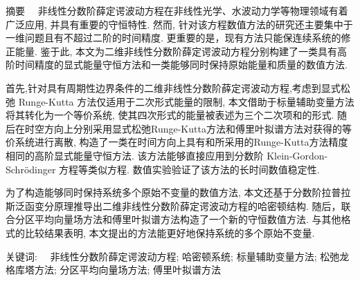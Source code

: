 
\begin{ChineseAbstract}[***]%
\item {\heiti 摘要\ \ }
非线性分数阶薛定谔波动方程在非线性光学、水波动力学等物理领域有着广泛应用, 并具有重要的守恒特性. 然而, 针对该方程数值方法的研究还主要集中于一维问题且有不超过二阶的时间精度. 更重要的是，现有方法只能保连续系统的修正能量. 鉴于此, 本文为二维非线性分数阶薛定谔波动方程分别构建了一类具有高阶时间精度的显式能量守恒方法和一类能够同时保持原始能量和质量的数值方法.  

首先,针对具有周期性边界条件的二维非线性分数阶薛定谔波动方程,考虑到显式松弛 Runge-Kutta 方法仅适用于二次形式能量的限制, 本文借助于标量辅助变量方法将其转化为一个等价系统, 使其四次形式的能量被表述为三个二次项和的形式. 随后在时空方向上分别采用显式松弛Runge-Kutta方法和傅里叶拟谱方法对获得的等价系统进行离散, 构造了一类在时间方向上具有和所采用的Runge-Kutta方法精度相同的高阶显式能量守恒方法. 该方法能够直接应用到分数阶 Klein-Gordon-Schr{\"o}dinger 方程等类似方程. 数值实验验证了该方法的长时间数值稳定性.

为了构造能够同时保持系统多个原始不变量的数值方法, 本文还基于分数阶拉普拉斯泛函变分原理推导出二维非线性分数阶薛定谔波动方程的哈密顿结构. 随后，联合分区平均向量场方法和傅里叶拟谱方法构造了一个新的守恒数值方法. 与其他格式的比较结果表明, 本文提出的方法能更好地保持系统的多个原始不变量.


\item {\heiti 关键词:\ \ } 非线性分数阶薛定谔波动方程; 哈密顿系统; 标量辅助变量方法; 松弛龙格库塔方法; 分区平均向量场方法; 傅里叶拟谱方法
\end{ChineseAbstract}
